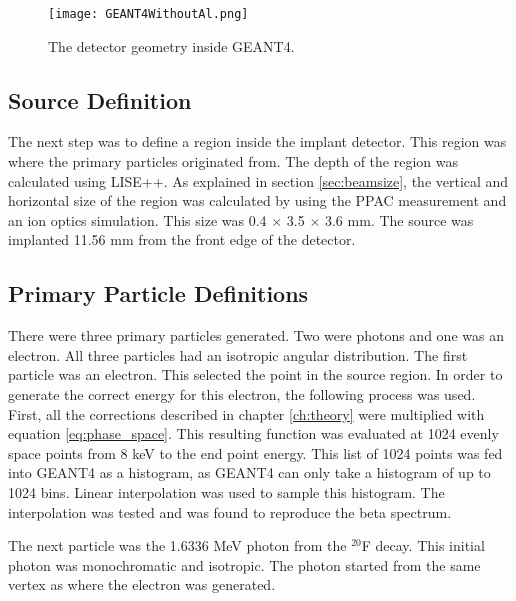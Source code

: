 \documentclass[../MaxHughesThesis.tex]{subfiles}
\begin{document}
\begin{figure}[!htb]
	\centerline{\texttt{[image: GEANT4WithoutAl.png]}}
	\caption{The detector geometry inside GEANT4.}
	\label{fig:GEANT4Det}
\end{figure}

\subsection{Source Definition}
The next step was to define a region inside the implant detector.
This region was where the primary particles originated from.
The depth of the region was calculated using LISE++.
As explained in section \ref{sec:beamsize}, the vertical and horizontal size of the region was calculated by using the PPAC measurement and an ion optics simulation.
This size was 0.4 $\times$ 3.5 $\times$ 3.6 mm.
The source was implanted 11.56 mm from the front edge of the detector.

\subsection{Primary Particle Definitions}
There were three primary particles generated.
Two were photons and one was an electron.
All three particles had an isotropic angular distribution.
The first particle was an electron. 
This selected the point in the source region.
In order to generate the correct energy for this electron, the following process was used.
First, all the corrections described in chapter \ref{ch:theory} were multiplied with equation \ref{eq:phase_space}.
This resulting function was evaluated at 1024 evenly space points from 8 keV to the end point energy.
This list of 1024 points was fed into GEANT4 as a histogram, as GEANT4 can only take a histogram of up to 1024 bins. 
Linear interpolation was used to sample this histogram.
The interpolation was tested and was found to reproduce the beta spectrum.

The next particle was the 1.6336 MeV photon from the $^{20}$F decay.
This initial photon was monochromatic and isotropic.
The photon started from the same vertex as where the electron was generated.
\end{document}
